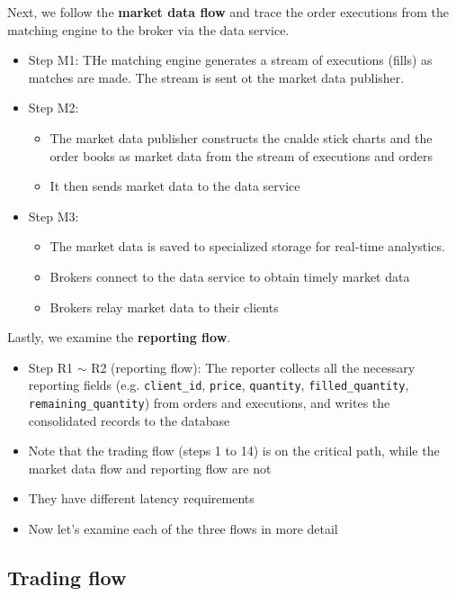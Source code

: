 \documentclass{report}
\theoremstyle{definition}
\let\oldsubsection\subsection
\renewcommand{\subsection}{\oldsubsection*}
\begin{document}
Next, we follow the \textbf{market data flow} and trace the order executions from the matching engine to the broker via the data service.

\begin{itemize}
\item
Step M1: THe matching engine generates a stream of executions (fills) as matches are made. The stream is sent ot the market data publisher.
\item
Step M2:
\begin{itemize}
\item
The market data publisher constructs the cnalde stick charts and the order books as market data from the stream of executions and orders
\item
It then sends market data to the data service
\end{itemize}
\item
Step M3:

\begin{itemize}
\item
The market data is saved to specialized storage for real-time analystics.
\item
Brokers connect to the data service to obtain timely market data
\item
Brokers relay market data to their clients
\end{itemize}
\end{itemize}

Lastly, we examine the \textbf{reporting flow}.

\begin{itemize}
\item
Step R1 $\sim$ R2 (reporting flow): The reporter collects all the necessary reporting fields (e.g. \lstinline|client_id|, \lstinline|price|, \lstinline|quantity|, \lstinline|filled_quantity|, \lstinline|remaining_quantity|) from orders and executions, and writes the consolidated records to the database
\item
Note that the trading flow (steps 1 to 14) is on the critical path, while the market data flow and reporting flow are not
\item
They have different latency requirements
\item
Now let's examine each of the three flows in more detail
\end{itemize}

\subsection{Trading flow}
\end{document}
